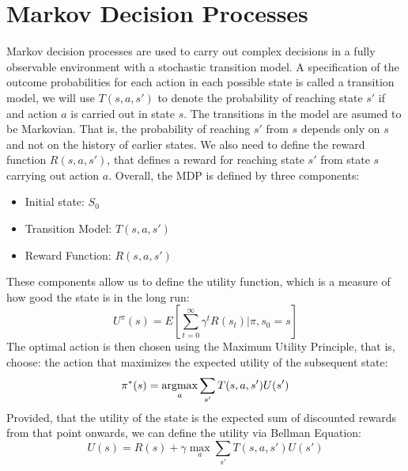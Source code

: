 \section{Markov Decision Processes}
\label{sec:markov_descision_processes}
Markov decision processes are used to carry out complex decisions in a fully
observable environment with a stochastic transition model. 
A specification of the outcome probabilities for each action in each possible state is
called a transition model, we will use $T(s, a, s')$ to denote the
probability of reaching state $s'$ if and action $a$ is carried out in state
$s$.
The transitions in the model are asumed to be Markovian. That is, the probability of
reaching $s'$ from $s$ depends only on $s$ and not on the history of earlier
states.
We also need to define the reward function $R(s, a, s')$, that defines a reward
for reaching state $s'$ from state $s$ carrying out action $a$.
Overall, the MDP is defined by three components:
\begin{itemize}
    \item Initial state: $S_0$
    \item Transition Model: $T(s, a, s')$
    \item Reward Function: $R(s, a, s')$
\end{itemize}
These components allow us to define the utility function, which is a measure of
how good the state is in the long run:
\begin{equation}
U^{\pi}(s) = E\left[\sum_{t=0}^{\infty} \gamma^t R(s_t) | \pi,s_0 = s \right]
\end{equation}
The optimal action is then chosen using the Maximum Utility Principle, that is,
choose: the action that maximizes the expected utility of the subsequent state:
\begin{equation}
\pi^*(s) = \mathop{\rm argmax}_a \sum_{s'} T(s, a, s')U(s')
\end{equation}
Provided, that the utility of the state is the expected sum of discounted
rewards from that point onwards, we can define the utility via Bellman Equation:
\begin{equation}
    U(s) = R(s) + \gamma \max_a \sum_{s'}T(s,a,s')U(s')
\end{equation}



